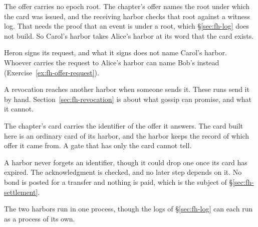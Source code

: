 
\begin{pdboundary}
\setlength{\parskip}{4pt plus 1pt}
The offer carries no epoch root. The chapter's offer names the root under
which the card was issued, and the receiving harbor checks that root
against a witness log. That needs the proof that an event is under a
root, which \S\ref{sec:fh-log} does not build. So Carol's harbor takes
Alice's harbor at its word that the card exists.

Heron signs its request, and what it signs does not name Carol's harbor.
Whoever carries the request to Alice's harbor can name Bob's instead
(Exercise~\ref{ex:fh-offer-request}).

A revocation reaches another harbor when someone sends it. These runs
send it by hand. Section~\ref{sec:fh-revocation} is about what gossip can
promise, and what it cannot.

The chapter's card carries the identifier of the offer it answers. The
card built here is an ordinary card of its harbor, and the harbor keeps
the record of which offer it came from. A gate that has only the card
cannot tell.

A harbor never forgets an identifier, though it could drop one once its
card has expired. The acknowledgment is checked, and no later step
depends on it. No bond is posted for a transfer and nothing is paid,
which is the subject of \S\ref{sec:fh-settlement}.

The two harbors run in one process, though the logs of
\S\ref{sec:fh-log} can each run as a process of its own.
\end{pdboundary}
